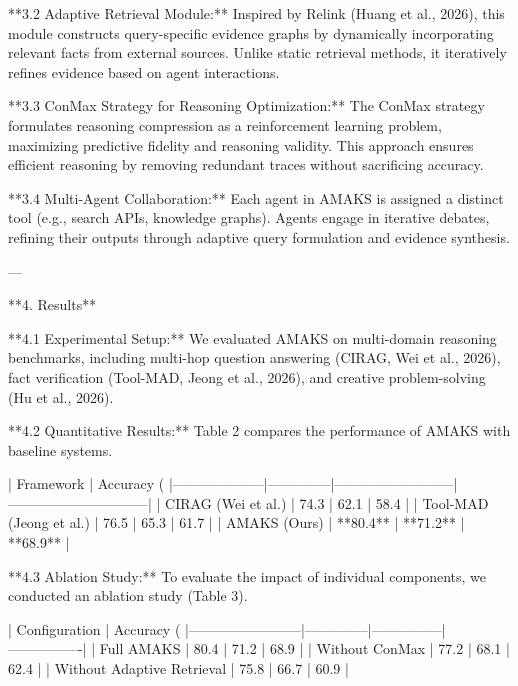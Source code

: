 **3.2 Adaptive Retrieval Module:**  
Inspired by Relink (Huang et al., 2026), this module constructs query-specific evidence graphs by dynamically incorporating relevant facts from external sources. Unlike static retrieval methods, it iteratively refines evidence based on agent interactions.  

**3.3 ConMax Strategy for Reasoning Optimization:**  
The ConMax strategy formulates reasoning compression as a reinforcement learning problem, maximizing predictive fidelity and reasoning validity. This approach ensures efficient reasoning by removing redundant traces without sacrificing accuracy.  

**3.4 Multi-Agent Collaboration:**  
Each agent in AMAKS is assigned a distinct tool (e.g., search APIs, knowledge graphs). Agents engage in iterative debates, refining their outputs through adaptive query formulation and evidence synthesis.  

---

**4. Results**  

**4.1 Experimental Setup:**  
We evaluated AMAKS on multi-domain reasoning benchmarks, including multi-hop question answering (CIRAG, Wei et al., 2026), fact verification (Tool-MAD, Jeong et al., 2026), and creative problem-solving (Hu et al., 2026).  

**4.2 Quantitative Results:**  
Table 2 compares the performance of AMAKS with baseline systems.  

| Framework          | Accuracy (%
|--------------------|--------------|--------------------------|------------------------------|  
| CIRAG (Wei et al.) | 74.3         | 62.1                     | 58.4                         |  
| Tool-MAD (Jeong et al.) | 76.5         | 65.3                     | 61.7                         |  
| AMAKS (Ours)       | **80.4**     | **71.2**                 | **68.9**                     |  

**4.3 Ablation Study:**  
To evaluate the impact of individual components, we conducted an ablation study (Table 3).  

| Configuration          | Accuracy (%
|------------------------|--------------|---------------|----------------|  
| Full AMAKS            | 80.4         | 71.2          | 68.9           |  
| Without ConMax         | 77.2         | 68.1          | 62.4           |  
| Without Adaptive Retrieval | 75.8         | 66.7          | 60.9           |  

